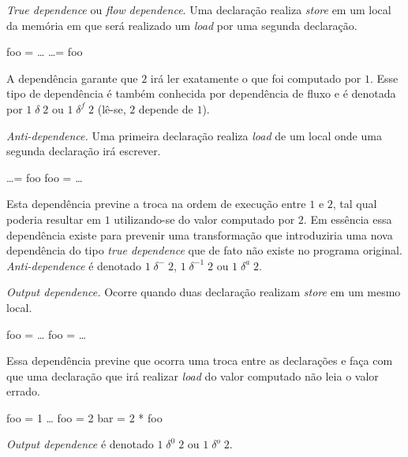 \begin{alineas}
\item \textit{True dependence} ou \textit{flow dependence}. Uma declaração realiza 
        \textit{store} em um local da memória em que será realizado um 
        \textit{load} por uma segunda declaração.
        \begin{algorithmic}[1]
        \STATE foo = \ldots
        \STATE \ldots = foo
        \end{algorithmic}
        A dependência garante que $2$ irá ler exatamente o que foi computado
        por $1$. Esse tipo de dependência é também conhecida por dependência 
        de fluxo e é denotada por  $1 \;\delta\; 2$ ou $1 \;\delta^f \; 2$ 
        (lê-se, $2$ depende de $1$).

        \item \textit{Anti-dependence.} Uma primeira declaração realiza
        \textit{load} de um local onde uma segunda declaração irá escrever.
        \begin{algorithmic}[1]
        \STATE \ldots = foo
        \STATE foo = \ldots
        \end{algorithmic}
        Esta dependência previne a troca na ordem de execução entre $1$ 
        e $2$, tal qual poderia resultar em $1$ utilizando-se do valor 
        computado por $2$. 
        Em essência essa dependência existe para prevenir uma transformação que 
        introduziria uma nova dependência do tipo \textit{true dependence} que 
        de fato não existe no programa original. 
        \textit{Anti-dependence} é denotado $1 \;\delta^- \;2$, 
        $1 \;\delta^{-1} \;2$ ou $1 \;\delta^{a} \;2$.

        \item \textit{Output dependence.} Ocorre quando duas declaração 
        realizam \textit{store} em um mesmo local.
        \begin{algorithmic}[1]
        \STATE foo = \ldots
        \STATE foo = \ldots
        \end{algorithmic}
        Essa dependência previne que ocorra uma troca entre as declarações e 
        faça com que uma declaração que irá realizar \textit{load} do valor 
        computado não leia o valor errado.
        \begin{algorithmic}[1]
        \STATE foo = 1
        \STATE \ldots
        \STATE foo = 2
        \STATE bar = 2 * foo
        \end{algorithmic}
        \textit{Output dependence} é denotado  $1 \;\delta^0 \;2$
        ou $1 \;\delta^o \;2$.
\end{alineas}

